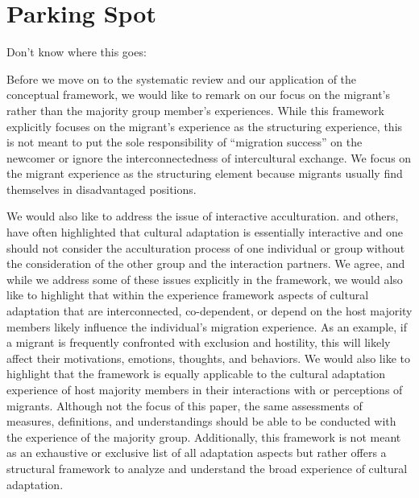 \documentclass[man, 12pt, a4paper]{apa7}
\begin{document}
\section{Parking Spot}
Don't know where this goes:

Before we move on to the systematic review and our application of the conceptual framework, we would like to remark on our focus on the migrant's rather than the majority group member's experiences. 
While this framework explicitly focuses on the migrant's experience as the structuring experience, this is not meant to put the sole responsibility of ``migration success'' on the newcomer or ignore the interconnectedness of intercultural exchange. We focus on the migrant experience as the structuring element because migrants usually find themselves in disadvantaged positions. 

We would also like to address the issue of interactive acculturation. \citet{Bourhis1997a} and others, have often highlighted that cultural adaptation is essentially interactive and one should not consider the acculturation process of one individual or group without the consideration of the other group and the interaction partners. We agree, and while we address some of these issues explicitly in the framework, we would also like to highlight that within the experience framework aspects of cultural adaptation that are interconnected, co-dependent, or depend on the host majority members likely influence the individual's migration experience. As an example, if a migrant is frequently confronted with exclusion and hostility, this will likely affect their motivations, emotions, thoughts, and behaviors. 
We would also like to highlight that the framework is equally applicable to the cultural adaptation experience of host majority members in their interactions with or perceptions of migrants. Although not the focus of this paper, the same assessments of measures, definitions, and understandings should be able to be conducted with the experience of the majority group.
Additionally, this framework is not meant as an exhaustive or exclusive list of all adaptation aspects but rather offers a structural framework to analyze and understand the broad experience of cultural adaptation.
\end{document}
